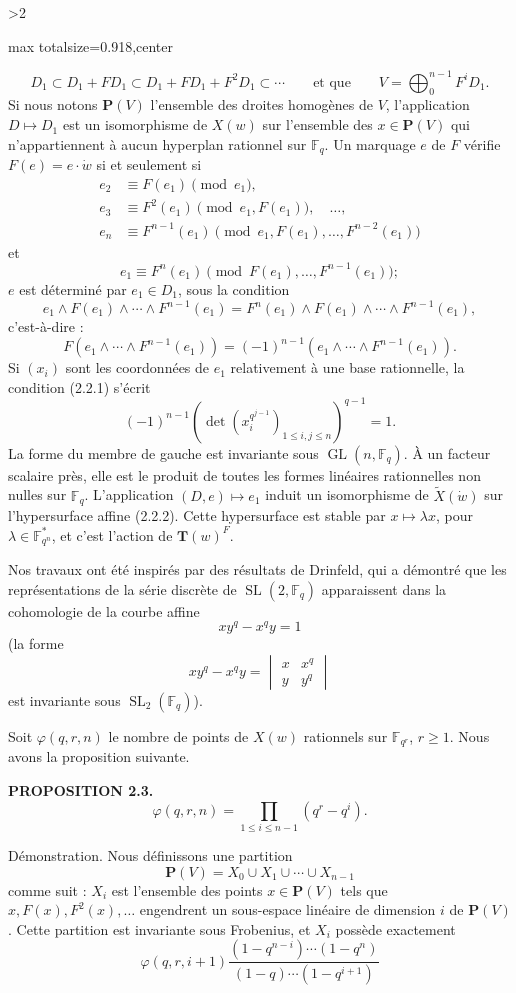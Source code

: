 \documentclass[9pt,twoside]{extarticle}
\newcommand{\EditionPage}[3]{%
  \ifnum#1>2\clearpage\fi
  \pdfbookmark[1]{Printed page #2}{fr-folio-#2}%
  \hypertarget{fr-physical-#1}{}%
  \noindent\begin{adjustbox}{max totalsize={\textwidth}{0.918\textheight},center}
  \begin{minipage}[t]{\textwidth}
  \fontsize{9.4}{11.1}\selectfont\justifying
  #3
  \end{minipage}
  \end{adjustbox}%
}
\begin{document}
\EditionPage{16}{117}{%
\[
D_1\subset D_1+FD_1\subset D_1+FD_1+F^2D_1\subset\cdots
\qquad\text{et que}\qquad
V=\bigoplus_0^{n-1}F^iD_1.
\] Si nous notons \(\mathbf P(V)\) l'ensemble des droites homogènes de \(V\), l'application \(D\mapsto D_1\) est un isomorphisme de \(X(w)\) sur l'ensemble des \(x\in\mathbf P(V)\) qui n'appartiennent à aucun hyperplan rationnel sur \(\mathbb F_q\). Un marquage \(e\) de \(F\) vérifie \(F(e)=e\cdot\dot w\) si et seulement si \[
\begin{aligned}
e_2&\equiv F(e_1)\pmod{e_1},\\
e_3&\equiv F^2(e_1)\pmod{e_1,F(e_1)},\quad\ldots,\\
e_n&\equiv F^{n-1}(e_1)\pmod{e_1,F(e_1),\ldots,F^{n-2}(e_1)}
\end{aligned}
\] et \[
e_1\equiv F^n(e_1)\pmod{F(e_1),\ldots,F^{n-1}(e_1)};
\]  \(e\) est déterminé par \(e_1\in D_1\), sous la condition \[
e_1\wedge F(e_1)\wedge\cdots\wedge F^{n-1}(e_1)
=
F^n(e_1)\wedge F(e_1)\wedge\cdots\wedge F^{n-1}(e_1),
\] c'est-à-dire : \[
\tag{2.2.1}
F(e_1\wedge\cdots\wedge F^{n-1}(e_1))
=(-1)^{n-1}(e_1\wedge\cdots\wedge F^{n-1}(e_1)).
\] Si \((x_i)\) sont les coordonnées de \(e_1\) relativement à une base rationnelle, la condition (2.2.1) s'écrit \[
\tag{2.2.2}
(-1)^{n-1}\left(\det(x_i^{q^{j-1}})_{1\le i,j\le n}\right)^{q-1}=1.
\] La forme du membre de gauche est invariante sous \(\operatorname{GL}(n,\mathbb F_q)\). À un facteur scalaire près, elle est le produit de toutes les formes linéaires rationnelles non nulles sur \(\mathbb F_q\). L'application \((D,e)\mapsto e_1\) induit un isomorphisme de \(\widetilde X(\dot w)\) sur l'hypersurface affine (2.2.2). Cette hypersurface est stable par \(x\mapsto\lambda x\), pour \(\lambda\in\mathbb F_{q^n}^*\), et c'est l'action de \(\mathbf T(w)^F\).\par

Nos travaux ont été inspirés par des résultats de Drinfeld, qui a démontré que les représentations de la série discrète de \(\operatorname{SL}(2,\mathbb F_q)\) apparaissent dans la cohomologie de la courbe affine \[
xy^q-x^qy=1
\] (la forme \[
xy^q-x^qy=\begin{vmatrix}x&x^q\\y&y^q\end{vmatrix}
\] est invariante sous \(\operatorname{SL}_2(\mathbb F_q)\)).\par

Soit \(\varphi(q,r,n)\) le nombre de points de \(X(w)\) rationnels sur \(\mathbb F_{q^r}\), \(r\ge1\). Nous avons la proposition suivante.\par

\noindent\textbf{PROPOSITION 2.3.} \[
\varphi(q,r,n)=\prod_{1\le i\le n-1}(q^r-q^i).
\]\par

Démonstration. Nous définissons une partition \[
\mathbf P(V)=X_0\cup X_1\cup\cdots\cup X_{n-1}
\] comme suit : \(X_i\) est l'ensemble des points \(x\in\mathbf P(V)\) tels que \(x,F(x),F^2(x),\ldots\) engendrent un sous-espace linéaire de dimension \(i\) de \(\mathbf P(V)\). Cette partition est invariante sous Frobenius, et \(X_i\) possède exactement \[
\varphi(q,r,i+1)\frac{(1-q^{n-i})\cdots(1-q^n)}{(1-q)\cdots(1-q^{i+1})}
\]\par
}
\end{document}
